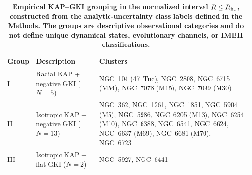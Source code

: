 \begin{table}
\centering
\caption{\textbf{Empirical KAP--GKI grouping in the normalized interval $R\leq R_{\rm h,l}$, constructed from the analytic-uncertainty class labels defined in the Methods. The groups are descriptive observational categories and do not define unique dynamical states, evolutionary channels, or IMBH classifications.}}
\label{tab:classification}
\small
\setlength{\tabcolsep}{5pt}
\begin{tabular}{lp{}p{}}
\hline
Group & Description & Clusters \\
\hline
I & Radial KAP + negative GKI ($N=5$) & NGC~104 (47~Tuc), NGC~2808, NGC~6715 (M54), NGC~7078 (M15), NGC~7099 (M30) \\
II & Isotropic KAP + negative GKI ($N=13$) & NGC~362, NGC~1261, NGC~1851, NGC~5904 (M5), NGC~5986, NGC~6205 (M13), NGC~6254 (M10), NGC~6388, NGC~6541, NGC~6624, NGC~6637 (M69), NGC~6681 (M70), NGC~6723 \\
III & Isotropic KAP + flat GKI ($N=2$) & NGC~5927, NGC~6441 \\
\hline
\end{tabular}
\end{table}
